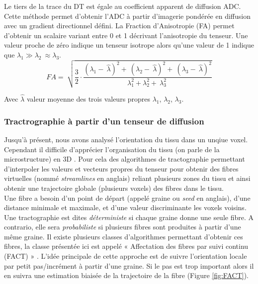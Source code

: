 Le tiers de la trace du DT est égale au coefficient apparent de diffusion ADC. Cette méthode permet d’obtenir l’ADC à partir d’imagerie pondérée en diffusion avec un gradient directionnel défini. La Fraction d’Anisotropie (FA) permet d’obtenir un scalaire variant entre 0 et 1 décrivant l’anisotropie du tenseur. Une valeur proche de zéro indique un tenseur isotrope alors qu’une valeur de 1 indique que $\lambda_1\gg\lambda_2\ \approx\lambda_3$.
\begin{equation}
\nonumber
FA=\ \sqrt{\frac{3}{2}\cdot\frac{{(\lambda_1-\ \hat{\lambda})}^2+\ {(\lambda_2-\ \hat{\lambda})}^2+\ {(\lambda_3-\ \hat{\lambda})}^2}{\lambda_1^2+\lambda_2^2+\ \lambda_3^2\ }}
\end{equation}

Avec $\hat{\lambda}$ valeur moyenne des trois valeurs propres $\lambda_1$, $\lambda_2$, $\lambda_3$. 

\subsubsection{Tractrographie à partir d’un tenseur de diffusion}

Jusqu’à présent, nous avons analysé l’orientation du tissu dans un unqiue voxel. Cependant il difficile d’apprécier l'organisation du tissu (on parle de la microstructure) en 3D . Pour cela des algorithmes de tractographie permettant d’interpoler les valeurs et vecteurs propres du tenseur pour obtenir des fibres virtuelles (nommé \textit{streamlines} en anglais) reliant plusieurs zones du tissu et ainsi obtenir une trajectoire globale (plusieurs voxels) des fibres dans le tissu.\\

Une fibre a besoin d’un point de départ (appelé graine ou \textit{seed} en anglais), d’une distance minimale et maximale, et d’une valeur discriminante les voxels voisins. Une tractographie est dites \textit{déterministe} si chaque graine donne une seule fibre. A contrario, elle sera \textit{probabiliste} si plusieurs fibres sont produites à partir d’une même graine. Il existe plusieurs classes d’algorithmes permettant d’obtenir ces fibres, la classe présentée ici est appelé « Affectation des fibres par suivi continu (FACT) » \cite{Mori1999}. L’idée principale de cette approche est de suivre l’orientation locale par petit pas/incrément à partir d’une graine. Si le pas est trop important alors il en suivra une estimation biaisée de la trajectoire de la fibre (Figure \ref{fig:FACT}). \\

